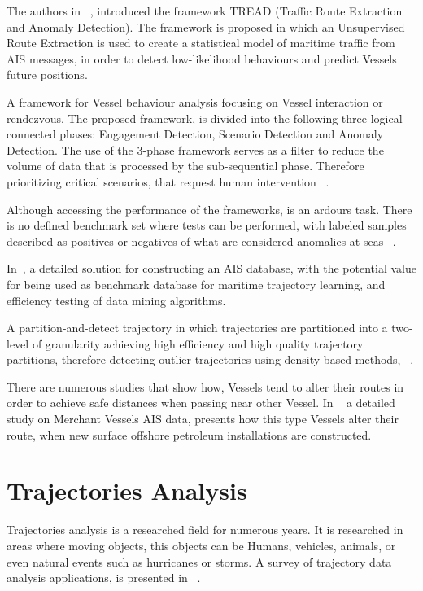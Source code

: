 The authors in ~\cite{Pallotta2013}, introduced the framework TREAD (Traffic Route Extraction and Anomaly Detection). The framework is proposed in which an Unsupervised Route Extraction is used to create a statistical model of maritime traffic from AIS messages, in order to detect low-likelihood behaviours and predict Vessels future positions.

A framework for Vessel behaviour analysis focusing on Vessel interaction or rendezvous. The proposed framework, is divided into the following three logical connected phases: Engagement Detection, Scenario  Detection and Anomaly Detection. The use of the 3-phase framework serves as a filter to reduce the volume of data that is processed by the sub-sequential phase. Therefore prioritizing critical scenarios, that request human intervention ~\cite{Shahir2015}.

Although accessing the performance of the frameworks, is an ardours task. There is no defined benchmark set where tests can be performed, with labeled samples described as positives or negatives of what are considered anomalies at seas ~\cite{Laxhammar2008}. 

In~\cite{Mao2016}, a detailed solution for constructing an AIS database, with the potential value for being used as benchmark database for maritime trajectory learning, and efficiency testing of data mining algorithms.

A partition-and-detect trajectory in which trajectories are partitioned into a two-level of granularity achieving high efficiency and high quality trajectory partitions, therefore detecting outlier trajectories using density-based methods, ~\cite{Lee}.

There are numerous studies that show how, Vessels tend to alter their routes in order to achieve safe distances when passing near other Vessel. In ~\cite{2017Offshore} a detailed study on Merchant Vessels AIS data, presents how this type Vessels alter their route, when new surface offshore petroleum installations are constructed.

\section{Trajectories Analysis}
\label{section: Trajectory Analysis}
Trajectories analysis is a researched field for numerous years. It is researched in areas where moving objects, this objects can be Humans, vehicles, animals, or even natural events such as hurricanes or storms.
A survey of trajectory data analysis applications, is presented in ~\cite{Feng2016}.

